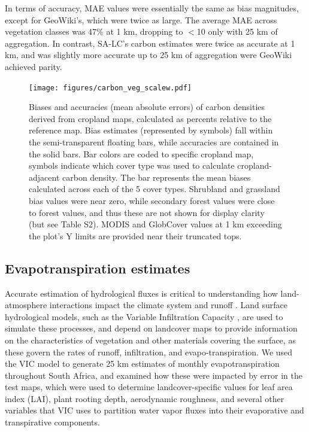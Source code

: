 \documentclass{pnastwo}
\begin{document}
\begin{article}
In terms of accuracy, MAE values were essentially the same as bias magnitudes, except for GeoWiki's, which were twice as large. The average MAE across vegetation classes was 47\% at 1 km, dropping to $<$10 only with 25 km of aggregation. In contrast, SA-LC's carbon estimates were twice as accurate at 1 km, and was slightly more accurate up to 25 km of aggregation were GeoWiki achieved parity.  

\begin{figure}[!h]
\centerline{\texttt{[image: figures/carbon\_veg\_scalew.pdf]}}
\caption{Biases and accuracies (mean absolute errors) of carbon densities derived from cropland maps, calculated as percents relative to the reference map. Bias estimates (represented by symbols) fall within the semi-transparent floating bars, while accuracies are contained in the solid bars. Bar colors are coded to specific cropland map, symbols indicate which cover type was used to calculate cropland-adjacent carbon density. The bar represents the mean biases calculated across each of the 5 cover types. Shrubland and grassland bias values were near zero, while secondary forest values were close to forest values, and thus these are not shown for display clarity (but see Table S2). MODIS and GlobCover values at 1 km exceeding the plot's Y limits are provided near their truncated tops.}
\label{afoto}
\end{figure}

\subsection{Evapotranspiration estimates}
Accurate estimation of hydrological fluxes is critical to understanding how land-atmosphere interactions impact the climate system and runoff \cite{liang_simple_1994}. Land surface hydrological models, such as the Variable Infiltration Capacity \cite{liang_simple_1994}, are used to simulate these processes, and depend on landcover maps to provide information on the characteristics of vegetation and other materials covering the surface, as these govern the rates of runoff, infiltration, and evapo-transpiration. We used the VIC model to generate 25 km estimates of monthly evapotranspiration throughout South Africa, and examined how these were impacted by error in the test maps, which were used to determine landcover-specific values for leaf area index (LAI), plant rooting depth, aerodynamic roughness, and several other variables that VIC uses to partition water vapor fluxes into their evaporative and transpirative components. 


\end{article}
\end{document}
